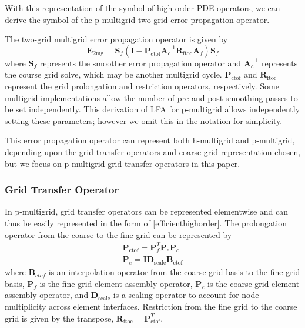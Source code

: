 \documentclass[review]{siamart190516}
\begin{document}
With this representation of the symbol of high-order PDE operators, we can derive the symbol of the p-multigrid two grid error propagation operator.

The two-grid multigrid error propagation operator is given by
\begin{equation}
\mathbf{E}_{\text{2mg}} = \mathbf{S}_f \left( \mathbf{I} - \mathbf{P}_{\text{ctof}} \mathbf{A}_c^{-1} \mathbf{R}_{\text{ftoc}} \mathbf{A}_f \right) \mathbf{S}_f
\end{equation}
where $\mathbf{S}_f$ represents the smoother error propagation operator and $\mathbf{A}_c^{-1}$ represents the course grid solve, which may be another multigrid cycle.
$\mathbf{P}_{\text{ctof}}$ and $\mathbf{R}_{\text{ftoc}}$ represent the grid prolongation and restriction operators, respectively.
Some multigrid implementations allow the number of pre and post smoothing passes to be set independently.
This derivation of LFA for p-multigrid allows independently setting these parameters; however we omit this in the notation for simplicity.

This error propagation operator can represent both h-multigrid and p-multigrid, depending upon the grid transfer operators and coarse grid representation chosen, but we focus on p-multigrid grid transfer operators in this paper.

\subsubsection{Grid Transfer Operator}\label{sec:grids}

In p-multigrid, grid transfer operators can be represented elementwise and can thus be easily represented in the form of \cref{efficienthighorder}.
The prolongation operator from the coarse to the fine grid can be represented by
\begin{equation}
\begin{split}
\mathbf{P}_{\text{ctof}} = \mathbf{P}_f^T \mathbf{P}_e \mathbf{P}_c\\
\mathbf{P}_e = \mathbf{I} \mathbf{D}_{\text{scale}} \mathbf{B}_{\text{ctof}}
\end{split}
\end{equation}
where $\mathbf{B}_{ctof}$ is an interpolation operator from the coarse grid basis to the fine grid basis, $\mathbf{P}_f$ is the fine grid element assembly operator, $\mathbf{P}_c$ is the coarse grid element assembly operator, and $\mathbf{D}_{\text{scale}}$ is a scaling operator to account for node multiplicity across element interfaces.
Restriction from the fine grid to the coarse grid is given by the transpose, $\mathbf{R}_{\text{ftoc}} = \mathbf{P}_{\text{ctof}}^T$.
\end{document}
